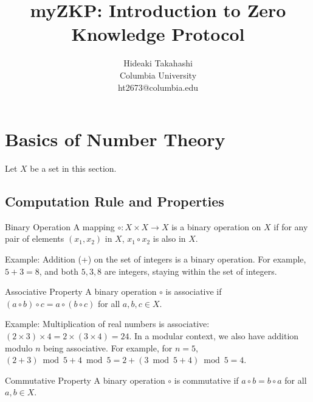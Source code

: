 \documentclass{article}
\title{myZKP: Introduction to Zero Knowledge Protocol
}
\author{
    Hideaki Takahashi \\
    Columbia University \\
    ht2673@columbia.edu
}
\begin{document}
\maketitle






\section{Basics of Number Theory}

Let $X$ be a set in this section.

\subsection{Computation Rule and Properties}

\begin{definition}{Binary Operation}{}
A mapping $\circ: X \times X \rightarrow X$ is a binary operation on $X$ if for any pair of elements $(x_1, x_2)$ in $X$, $x_1 \circ x_2$ is also in $X$.
\end{definition}

Example: Addition (+) on the set of integers is a binary operation. For example, $5 + 3 = 8$, and both $5, 3, 8$ are integers, staying within the set of integers.

\begin{definition}{Associative Property}{}
A binary operation $\circ$ is associative if $(a \circ b) \circ c = a \circ (b \circ c)$ for all $a, b, c \in X$.
\end{definition}

Example: Multiplication of real numbers is associative: $(2 \times 3) \times 4 = 2 \times (3 \times 4) = 24$. In a modular context, we also have addition modulo $n$ being associative. For example, for $n = 5$, $(2 + 3) \bmod 5 + 4 \bmod 5 = 2 + (3 \bmod 5 + 4) \bmod 5 = 4$.

\begin{definition}{Commutative Property}{}
A binary operation $\circ$ is commutative if $a \circ b = b \circ a$ for all $a, b \in X$.
\end{definition}
\end{document}
